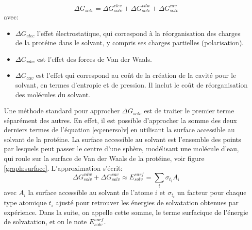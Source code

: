 \begin{equation}
  \label{eq:enersolv}
  \Delta G_{solv} = \Delta G_{solv}^{elec} + \Delta G_{solv}^{vdw} + \Delta G_{solv}^{cav}
\end{equation}
avec:

\begin{itemize}
\item $\Delta G_{elec}$ l'effet électrostatique, qui correspond à la réorganisation des charges de la protéine dans le solvant, y compris ses charges partielles (polarisation).
\item $\Delta G_{vdw}$ est l'effet des forces de Van der Waals.
\item $\Delta G_{cav}$ est l'effet qui correspond au coût de la création de la cavité pour le solvant, en termes d'entropie et de pression. Il inclut le coût de réorganisation des molécules du solvant.
\end{itemize}

Une méthode standard pour approcher $\Delta G_{solv}$ est de traiter le premier terme séparément des autres. En effet, il est possible d'approcher la somme des deux derniers termes de l'équation  \ref{eq:enersolv} en utilisant la surface accessible au solvant de la protéine. La surface accessible au solvant est l'ensemble des points par lesquels peut passer le centre d'une sphère, modélisant une molécule d'eau, qui roule sur la surface de Van der Waals de la protéine, voir figure \ref{graph:surface}. L'approximation s'écrit:
\begin{equation}
  \label{eq:SA}
\Delta G_{solv}^{vdw} + \Delta G_{solv}^{cav} \approx E_{solv}^{surf} = \sum_i \sigma_{t_i} A_i
\end{equation}
avec $A_i$ la surface accessible au solvant de l'atome $i$  et $\sigma_{t_i}$ un facteur pour chaque type atomique $t_i$ ajusté pour retrouver les énergies de solvatation obtenues par expérience.
Dans la suite, on appelle cette somme, le terme surfacique de l'énergie de solvatation, et on le note $E_{solv}^{surf}$.


